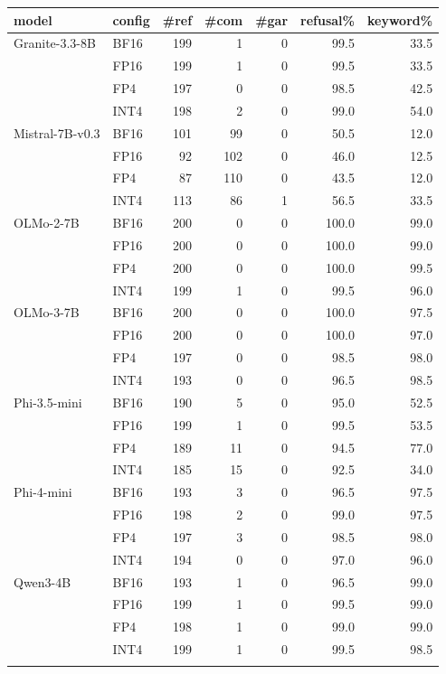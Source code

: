\begin{tabular}{@{}>{\raggedright\arraybackslash}p{1.45cm} l r r r r r@{}}
\toprule
model & config & \#ref & \#com & \#gar & refusal\% & keyword\% \\
\midrule
Granite-3.3-8B & BF16 & 199 & 1 & 0 & 99.5 & 33.5 \\
 & FP16 & 199 & 1 & 0 & 99.5 & 33.5 \\
 & FP4 & 197 & 0 & 0 & 98.5 & 42.5 \\
 & INT4 & 198 & 2 & 0 & 99.0 & 54.0 \\
\addlinespace
Mistral-7B-v0.3 & BF16 & 101 & 99 & 0 & 50.5 & 12.0 \\
 & FP16 & 92 & 102 & 0 & 46.0 & 12.5 \\
 & FP4 & 87 & 110 & 0 & 43.5 & 12.0 \\
 & INT4 & 113 & 86 & 1 & 56.5 & 33.5 \\
\addlinespace
OLMo-2-7B & BF16 & 200 & 0 & 0 & 100.0 & 99.0 \\
 & FP16 & 200 & 0 & 0 & 100.0 & 99.0 \\
 & FP4 & 200 & 0 & 0 & 100.0 & 99.5 \\
 & INT4 & 199 & 1 & 0 & 99.5 & 96.0 \\
\addlinespace
OLMo-3-7B & BF16 & 200 & 0 & 0 & 100.0 & 97.5 \\
 & FP16 & 200 & 0 & 0 & 100.0 & 97.0 \\
 & FP4 & 197 & 0 & 0 & 98.5 & 98.0 \\
 & INT4 & 193 & 0 & 0 & 96.5 & 98.5 \\
\addlinespace
Phi-3.5-mini & BF16 & 190 & 5 & 0 & 95.0 & 52.5 \\
 & FP16 & 199 & 1 & 0 & 99.5 & 53.5 \\
 & FP4 & 189 & 11 & 0 & 94.5 & 77.0 \\
 & INT4 & 185 & 15 & 0 & 92.5 & 34.0 \\
\addlinespace
Phi-4-mini & BF16 & 193 & 3 & 0 & 96.5 & 97.5 \\
 & FP16 & 198 & 2 & 0 & 99.0 & 97.5 \\
 & FP4 & 197 & 3 & 0 & 98.5 & 98.0 \\
 & INT4 & 194 & 0 & 0 & 97.0 & 96.0 \\
\addlinespace
Qwen3-4B & BF16 & 193 & 1 & 0 & 96.5 & 99.0 \\
 & FP16 & 199 & 1 & 0 & 99.5 & 99.0 \\
 & FP4 & 198 & 1 & 0 & 99.0 & 99.0 \\
 & INT4 & 199 & 1 & 0 & 99.5 & 98.5 \\
\addlinespace
\bottomrule
\end{tabular}
